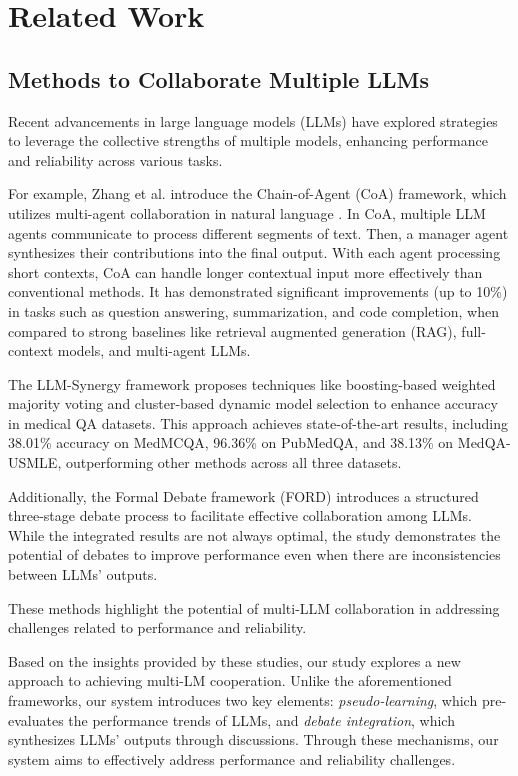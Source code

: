 \section{Related Work}
\label{sec-relatedwork}
\subsection{Methods to Collaborate Multiple LLMs}

Recent advancements in large language models (LLMs) have explored strategies to leverage the collective strengths of multiple models, enhancing performance and reliability across various tasks.

For example, Zhang et al. introduce the Chain-of-Agent (CoA) framework, which utilizes multi-agent collaboration in natural language \citep{CoA}.
In CoA, multiple LLM agents communicate to process different segments of text.
Then, a manager agent synthesizes their contributions into the final output.
With each agent processing short contexts, CoA can handle longer contextual input more effectively than conventional methods.
It has demonstrated significant improvements (up to 10\%) in tasks such as question answering, summarization, and code completion, when compared to strong baselines like retrieval augmented generation (RAG), full-context models, and multi-agent LLMs.

The LLM-Synergy framework \citep{yang2023one} proposes techniques like boosting-based weighted majority voting and cluster-based dynamic model selection to enhance accuracy in medical QA datasets.
This approach achieves state-of-the-art results, including 38.01\% accuracy on MedMCQA, 96.36\% on PubMedQA, and 38.13\% on MedQA-USMLE, outperforming other methods across all three datasets.

Additionally, the Formal Debate framework (FORD) \citep{ford} introduces a structured three-stage debate process to facilitate effective collaboration among LLMs.
While the integrated results are not always optimal, the study demonstrates the potential of debates to improve performance even when there are inconsistencies between LLMs' outputs.

These methods highlight the potential of multi-LLM collaboration in addressing challenges related to performance and reliability.

Based on the insights provided by these studies, our study explores a new approach to achieving multi-LM cooperation.
Unlike the aforementioned frameworks, our system introduces two key elements: \textit{pseudo-learning}, which pre-evaluates the performance trends of LLMs, and \textit{debate integration}, which synthesizes LLMs' outputs through discussions.
Through these mechanisms, our system aims to effectively address performance and reliability challenges.

